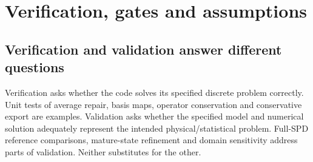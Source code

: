 \chapter{Verification, gates and assumptions}\label{app:assumptions}
\section{Verification and validation answer different questions}
Verification asks whether the code solves its specified discrete problem correctly. Unit tests of average repair, basis maps, operator conservation and conservative export are examples. Validation asks whether the specified model and numerical solution adequately represent the intended physical/statistical problem. Full-SPD reference comparisons, mature-state refinement and domain sensitivity address parts of validation. Neither substitutes for the other.

